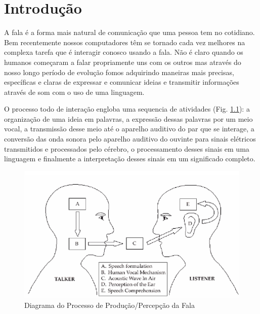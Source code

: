 \chapter{Introdução}
\label{cap:introducao}

A fala é a forma mais natural de comunicação que uma pessoa tem no cotidiano. Bem recentemente nossos computadores têm se tornado cada vez melhores na complexa tarefa que é interagir conosco usando a fala. Não é claro quando os humanos começaram a falar propriamente uns com os outros mas através do nosso longo período de evolução fomos adquirindo maneiras mais precisas, específicas e claras de expressar e comunicar ideias e transmitir informações através de som com o uso de uma linguagem.

O processo todo de interação engloba uma sequencia de atividades (Fig. \ref{fig:processo_de_fala}): a organização de uma ideia em palavras, a expressão dessas palavras por um meio vocal, a transmissão desse meio até o aparelho auditivo do par que se interage, a conversão das onda sonora pelo aparelho auditivo do ouvinte para sinais elétricos transmitidos e processados pelo cérebro, o processamento desses sinais em uma linguagem e finalmente a interpretação desses sinais em um significado completo.

\begin{figure}
	\centering
	\includegraphics[width=\textwidth]{figuras/processo_de_fala.png}
	\caption[Diagrama do Processo de Produção/Percepção da Fala]{Diagrama do Processo de Produção/Percepção da Fala \cite{speech_process}}
	\label{fig:processo_de_fala}
\end{figure}

